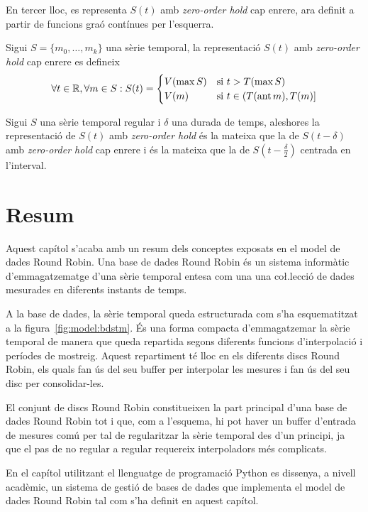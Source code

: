 En tercer lloc, es representa $S(t)$ amb \emph{zero-order hold} cap enrere, ara definit a partir de funcions graó contínues per l'esquerra.
\begin{definition}
  Sigui $S=\{m_0,\ldots,m_k\}$ una sèrie temporal, la representació
  $S(t)$ amb \emph{zero-order hold} cap enrere es defineix
\[
\forall t \in \mathbb{R}  ,\forall m \in S:
S(t) =  
\begin{cases}
  V(\max S) & \text{si } t > T(\max S) \\
  V(m) & \text{si }  t\in (T(\operatorname*{ant} m),T(m)]
\end{cases}
\]
\end{definition}

Sigui $S$ una sèrie temporal regular i $\delta$ una durada de temps, aleshores la representació de $S(t)$ amb \emph{zero-order hold} és la mateixa que la de $S(t-\delta)$ amb \emph{zero-order hold} cap enrere i és la mateixa que la de $S(t-\frac{\delta}{2})$ centrada en l'interval. 





\section{Resum}

Aquest capítol s'acaba amb un resum dels conceptes exposats en el model de dades Round Robin. Una base de dades Round Robin és un sistema informàtic d'emmagatzematge d'una sèrie temporal entesa com una  una co\l.lecció de dades mesurades en diferents instants de temps.

A la base de dades, la sèrie temporal queda estructurada com s'ha esquematitzat a  la figura~\ref{fig:model:bdstm}. És una forma compacta d'emmagatzemar la sèrie temporal de manera que queda repartida segons diferents funcions d'interpolació i períodes de mostreig. Aquest repartiment té lloc en els diferents discs Round Robin, els quals fan ús del seu buffer per interpolar les mesures i fan ús del seu disc per consolidar-les. 

El conjunt de discs Round Robin constitueixen la part principal d'una base de dades Round Robin tot i que, com a l'esquema, hi pot haver un buffer d'entrada de mesures comú per tal de regularitzar la sèrie temporal des d'un principi, ja que el pas de no regular a regular requereix interpoladors més complicats.


En el capítol%
 utilitzant el llenguatge de programació Python es dissenya, a nivell acadèmic, un sistema de gestió de bases de dades que implementa el model de dades Round Robin tal com s'ha definit en aquest capítol.


